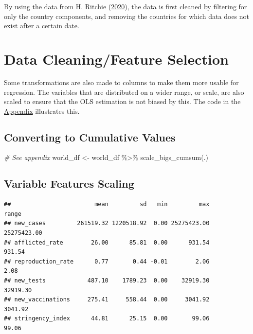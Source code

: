 \documentclass[11pt,preprint, authoryear]{elsarticle}
\numberwithin{equation}{section}
\numberwithin{figure}{section}
\numberwithin{table}{section}
\newenvironment{Shaded}{\begin{snugshade}}{\end{snugshade}}
\newcommand{\CommentTok}[1]{\textcolor[rgb]{0.56,0.35,0.01}{\textit{#1}}}
\newcommand{\FunctionTok}[1]{\textcolor[rgb]{0.00,0.00,0.00}{#1}}
\newcommand{\NormalTok}[1]{#1}
\newcommand{\OtherTok}[1]{\textcolor[rgb]{0.56,0.35,0.01}{#1}}
\newcommand{\SpecialCharTok}[1]{\textcolor[rgb]{0.00,0.00,0.00}{#1}}
\begin{document}
By using the data from H. Ritchie
(\protect\hyperlink{ref-dataset}{2020}), the data is first cleaned by
filtering for only the country components, and removing the countries
for which data does not exist after a certain date.

\hypertarget{data-cleaningfeature-selection}{%
\section{Data Cleaning/Feature
Selection}\label{data-cleaningfeature-selection}}

Some transformations are also made to columns to make them more usable
for regression. The variables that are distributed on a wider range, or
scale, are also scaled to ensure that the OLS estimation is not biased
by this. The code in the \protect\hyperlink{appendix}{Appendix}
illustrates this.

\hypertarget{converting-to-cumulative-values}{%
\subsection{Converting to Cumulative
Values}\label{converting-to-cumulative-values}}

\begin{Shaded}
\begin{Highlighting}[]
\CommentTok{\# See appendix}
\NormalTok{world\_df }\OtherTok{\textless{}{-}}\NormalTok{ world\_df }\SpecialCharTok{\%\textgreater{}\%} \FunctionTok{scale\_bigs\_cumsum}\NormalTok{(.)}
\end{Highlighting}
\end{Shaded}

\hypertarget{variable-features-scaling}{%
\subsection{Variable Features Scaling}\label{variable-features-scaling}}

\begin{verbatim}
##                        mean         sd   min         max       range
## new_cases         261519.32 1220518.92  0.00 25275423.00 25275423.00
## afflicted_rate        26.00      85.81  0.00      931.54      931.54
## reproduction_rate      0.77       0.44 -0.01        2.06        2.08
## new_tests            487.10    1789.23  0.00    32919.30    32919.30
## new_vaccinations     275.41     558.44  0.00     3041.92     3041.92
## stringency_index      44.81      25.15  0.00       99.06       99.06
\end{verbatim}
\end{document}
